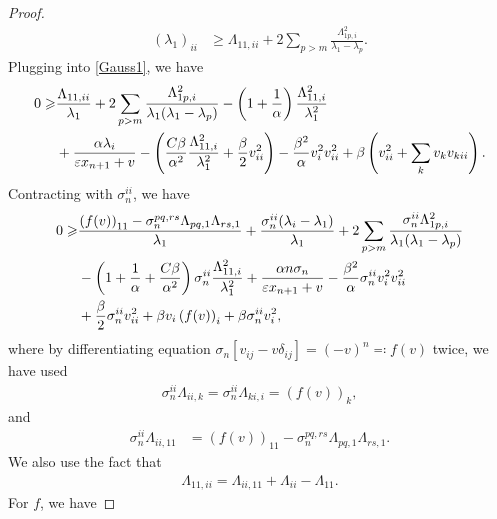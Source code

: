 \documentclass[reqno]{amsart}
\theoremstyle{remark}
\theoremstyle{definition}
\numberwithin{equation}{section}
\begin{document}
\begin{proof}
\begin{align}
        \left( \lambda_1 \right)_{ii} &\geqslant \Lambda_{11,ii} + 2 \sum_{p > m} \frac{\Lambda^2_{1p,i}}{\lambda_1 - \lambda_p}. 
    \end{align}
    Plugging into \eqref{Gauss1}, we have
    \begin{align}\label{Gauss2}
        0 \geqslant& 
        \frac{\Lambda_{11,ii}}{\lambda_1} + 2 \sum_{p > m} \frac{\Lambda^2_{1p,i}}{\lambda_1(\lambda_1 - \lambda_p)} - \left( 1+\frac{1}{\alpha} \right)\frac{\Lambda_{11,i}^2}{\lambda_1^2} 
        \notag \\
        &+ \frac{\alpha \lambda_i}{\varepsilon x_{n+1} + v} 
        - \left( \frac{C\beta}{\alpha^2}\frac{\Lambda_{11,i}^2}{\lambda_1^2} + \frac{\beta}{2}v_{ii}^2 \right) - \frac{\beta^2}{\alpha}v_{i}^2v_{ii}^2 
        + \beta \left( v_{ii}^2 + \sum_k v_kv_{kii} \right).
    \end{align}
    Contracting with $\sigma_n^{ii}$, we have
    \begin{align}
        0 \geqslant& 
        \frac{\left( f(v) \right)_{11} - \sigma_n^{pq,rs} \Lambda_{pq,1}\Lambda_{rs,1}}{\lambda_1} + \frac{\sigma_n^{ii}(\lambda_i - \lambda_1)}{\lambda_1} + 2 \sum_{p > m} \frac{\sigma_n^{ii}\Lambda^2_{1p,i}}{\lambda_1(\lambda_1 - \lambda_p)} 
        \notag \\
        &- \left( 1+\frac{1}{\alpha}+\frac{C\beta}{\alpha^2} \right)\sigma_n^{ii} \frac{\Lambda_{11,i}^2}{\lambda_1^2} + \frac{\alpha n \sigma_n}{\varepsilon x_{n+1} + v} 
        - \frac{\beta^2}{\alpha} \sigma_n^{ii}v_{i}^2v_{ii}^2 
        \notag \\
        &+ \frac{\beta}{2} \sigma_n^{ii}v_{ii}^2 
        + \beta v_i \left( f(v) \right)_i 
        + \beta \sigma_n^{ii} v_i^2,
    \end{align}
    where by differentiating equation $\sigma_n \left[v_{ij}-v\delta_{ij}\right] = (-v)^n \eqqcolon f(v)$ twice, we have used 
    \begin{align}
        \sigma_n^{ii}\Lambda_{ii,k} = \sigma_n^{ii}\Lambda_{ki,i} = \left( f(v) \right)_k,
    \end{align}
    and 
    \begin{align}
        \sigma_n^{ii}\Lambda_{ii,11} &= \left( f(v) \right)_{11} - \sigma_n^{pq,rs} \Lambda_{pq,1}\Lambda_{rs,1}.
    \end{align}
    We also use the fact that
    \begin{align}
        \Lambda_{11,ii} = \Lambda_{ii,11} + \Lambda_{ii} - \Lambda_{11}.
    \end{align}
    For $f$, we have

\end{proof}
\end{document}
